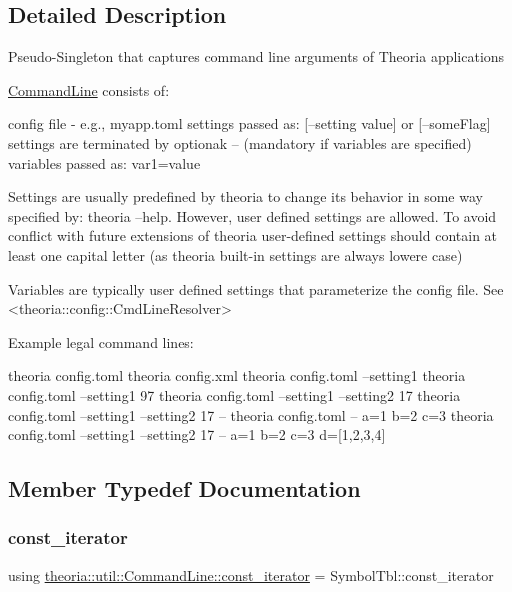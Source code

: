 \subsection{Detailed Description}
Pseudo-\/\+Singleton that captures command line arguments of Theoria applications

\hyperlink{classtheoria_1_1util_1_1CommandLine}{Command\+Line} consists of\+: \begin{DoxyVerb} config file - e.g., myapp.toml
 settings passed as: [--setting value] or [--someFlag] 
 settings are terminated by optionak -- (mandatory if variables are specified)
 variables passed as: var1=value

 Settings are usually predefined by theoria to change its behavior in some way specified by: theoria --help.
 However, user defined settings are allowed. To avoid conflict with future extensions of theoria
 user-defined settings should contain at least one capital letter (as theoria built-in settings are always lowere case)


 Variables are typically user defined settings that parameterize the config file. 
 See <theoria::config::CmdLineResolver>
\end{DoxyVerb}


Example legal command lines\+: \begin{DoxyVerb} theoria config.toml
 theoria config.xml
 theoria config.toml --setting1
 theoria config.toml --setting1 97
 theoria config.toml --setting1 --setting2 17
 theoria config.toml --setting1 --setting2 17 --
 theoria config.toml -- a=1 b=2 c=3
 theoria config.toml --setting1 --setting2 17 -- a=1 b=2 c=3 d=[1,2,3,4]\end{DoxyVerb}
 

\subsection{Member Typedef Documentation}
\mbox{\label{classtheoria_1_1util_1_1CommandLine_a729aa00feedd8257d4caafc73ac6ee63}} 
\subsubsection{\texorpdfstring{const\+\_\+iterator}{const\_iterator}}
{\footnotesize\ttfamily using \hyperlink{classtheoria_1_1util_1_1CommandLine_a729aa00feedd8257d4caafc73ac6ee63}{theoria\+::util\+::\+Command\+Line\+::const\+\_\+iterator} =  Symbol\+Tbl\+::const\+\_\+iterator}

